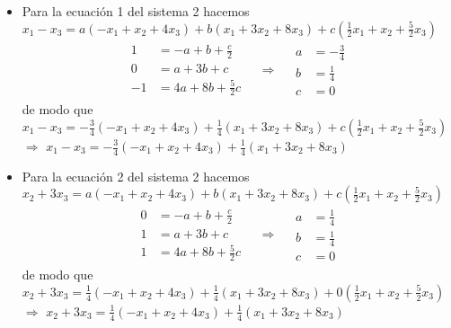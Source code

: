 \documentclass[10pt,a4paper]{jhwhw}
\begin{document}
\begin{itemize}
		\item Para la ecuación 1 del sistema 2 hacemos $x_1-x_3=a(-x_1+x_2+4x_3)+b(x_1+3x_2+8x_3)+c(\frac{1}{2}x_1+x_2+\frac{5}{2}x_3)$
		\begin{align*}
		\begin{aligned}
		1&= -a+b+\frac{c}{2} \\
		0 &=	a+3b+c	\\
		-1&=4a+8b+\frac{5}{2}c
		\end{aligned}
		\quad
		\Rightarrow
		\quad
		\begin{aligned}
		a&=-\frac{3}{4} \\
		b&=\frac{1}{4}	\\
		c&=0
		\end{aligned}
		\end{align*}
		de modo que $x_1-x_3=-\frac{3}{4}(-x_1+x_2+4x_3)+\frac{1}{4}(x_1+3x_2+8x_3)+c(\frac{1}{2}x_1+x_2+\frac{5}{2}x_3)$  $\Rightarrow$  $x_1-x_3=-\frac{3}{4}(-x_1+x_2+4x_3)+\frac{1}{4}(x_1+3x_2+8x_3)$
		
		
		\item Para la ecuación 2 del sistema 2 hacemos $x_2+3x_3=a(-x_1+x_2+4x_3)+b(x_1+3x_2+8x_3)+c(\frac{1}{2}x_1+x_2+\frac{5}{2}x_3)$
		\begin{align*}
		\begin{aligned}
		0&= -a+b+\frac{c}{2} \\
		1 &=	a+3b+c	\\
		1&=4a+8b+\frac{5}{2}c
		\end{aligned}
		\quad
		\Rightarrow
		\quad
		\begin{aligned}
		a&=\frac{1}{4} \\
		b&=\frac{1}{4}	\\
		c&=0
		\end{aligned}
		\end{align*}
		de modo que $x_2+3x_3=\frac{1}{4}(-x_1+x_2+4x_3)+\frac{1}{4}(x_1+3x_2+8x_3)+0(\frac{1}{2}x_1+x_2+\frac{5}{2}x_3)$ $\Rightarrow$  $x_2+3x_3=\frac{1}{4}(-x_1+x_2+4x_3)+\frac{1}{4}(x_1+3x_2+8x_3)$
	\end{itemize}
	
\end{document}
